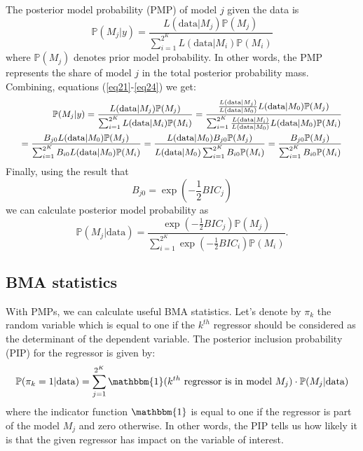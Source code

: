 \documentclass[a4paper]{article}
\begin{document}
The posterior model probability (PMP) of model $j$ given the data is
\begin{equation}\label{eq24}
    \mathbb{P}(M_{j}|y)=\frac{L(\text{data}|M_{j})\mathbb{P}(M_{j})}{\sum_{i=1}^{2^K}L(\text{data}|M_{i})\mathbb{P}(M_{i})}
\end{equation}
where $\mathbb{P}(M_{j})$ denotes prior model probability.
In other words, the PMP represents the share of model $j$ in the total posterior probability mass.
Combining, equations (\ref{eq21}-\ref{eq24}) we get:
\begin{equation}\label{eq25}
\fontsize{9pt}{12pt} \selectfont
\begin{split}
    \mathbb{P}(M_{j}|y)=\frac{L(\text{data}|M_{j})\mathbb{P}(M_{j})}{\sum_{i=1}^{2^K}L(\text{data}|M_{i})\mathbb{P}(M_{i})}
    =\frac{\frac{L(\text{data}|M_{j})}{L(\text{data}|M_{0})}
    L(\text{data}|M_{0})\mathbb{P}(M_{j})}{\sum_{i=1}^{2^K}\frac{L(\text{data}|M_{i})}{L(\text{data}|M_{0})}
    L(\text{data}|M_{0})\mathbb{P}(M_{i})}\\
    =\frac{B_{j0}L(\text{data}|M_{0})\mathbb{P}(M_{j})}{\sum_{i=1}^{2^K}B_{i0}
    L(\text{data}|M_{0})\mathbb{P}(M_{i})}
    =\frac{L(\text{data}|M_{0})B_{j0}\mathbb{P}(M_{j})}{L(\text{data}|M_{0})\sum_{i=1}^{2^K}B_{i0}\mathbb{P}(M_{i})}
    =\frac{B_{j0}\mathbb{P}(M_{j})}{\sum_{i=1}^{2^K}B_{i0}\mathbb{P}(M_{i})}
\end{split}
\end{equation}
\normalsize
Finally, using the result that
\begin{equation}\label{eq26}
 B_{j0}=\exp{(-\frac{1}{2}BIC_{j})}
\end{equation}
we can calculate posterior model probability as
\begin{equation}\label{eq27}
    \mathbb{P}(M_{j}|\text{data})=\frac{\exp{(-\frac{1}{2}BIC_{j})}\mathbb{P}(M_{j})}{\sum_{i=1}^{2^K}\exp{(-\frac{1}{2}BIC_{i})} \mathbb{P}(M_{i})}.
\end{equation}

\subsection{BMA statistics}
\noindent With PMPs, we can calculate useful BMA statistics.
Let's denote by $\pi_k$ the random variable which is equal to one if the $k^{th}$ regressor should be considered as the determinant of the dependent variable.
The posterior inclusion probability (PIP) for the regressor is given by:
\begin{equation}
\mathbb{P}(\pi_k = 1 |\text{data}) = \sum_{j=1}^{2^K} \mathbbm{1} (k^{th} \text{ regressor is in model } M_{j}) \cdot \mathbb{P}(M_{j}|\text{data})
\end{equation}
where the indicator function $\mathbbm{1}$ is equal to one if the regressor is part of the model $M_j$ and zero otherwise.
In other words, the PIP tells us how likely it is that the given regressor has impact on the variable of interest.
\end{document}
